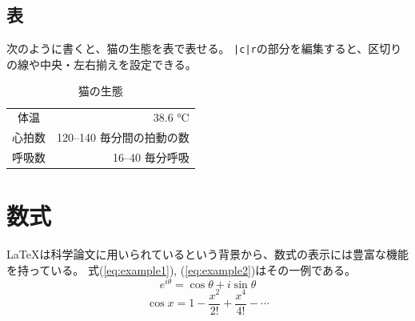 \documentclass[uplatex, a4paper,twocolumn, 14pt]{jsarticle}
\begin{document}
\subsection{表}
次のように書くと、猫の生態を表で表せる。
\verb+|c|r+の部分を編集すると、区切りの線や中央・左右揃えを設定できる。

\begin{table}[tbh]
    \begin{center}
        \begin{tabular}{|c|r}
            体温 & 38.6 °C \\
            心拍数 & 120–140 毎分間の拍動の数 \\
            呼吸数 & 16–40 毎分呼吸
        \end{tabular}
        \caption{猫の生態\cite{kahn2007merck}}
        \label{tab:table-name}
    \end{center}
\end{table}

\section{数式 \label{sec:equation}}

LaTeXは科学論文に用いられているという背景から、数式の表示には豊富な機能を持っている。
式(\ref{eq:example1}), (\ref{eq:example2})はその一例である。
\begin{equation} \label{eq:example1}
    e^{i \theta} = \cos{\theta} + i \sin{\theta}
\end{equation}
\begin{equation} \label{eq:example2}
    \cos{x} = 1 - \frac{x^2}{2!} + \frac{x^4}{4!} - \cdots
\end{equation}

{}

\end{document}

